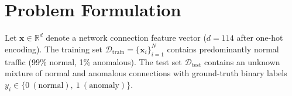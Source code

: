 \documentclass[12pt,a4paper]{article}
\begin{document}
\begin{table}[h!]
\centering
\caption{Comparison of Related Works and the Proposed Method}
\label{tab:related_gap}
\end{table}

\section{Problem Formulation}

Let $\mathbf{x} \in \mathbb{R}^{d}$ denote a network connection feature vector
($d = 114$ after one-hot encoding). The training set
$\mathcal{D}_{\text{train}} = \{\mathbf{x}_i\}_{i=1}^{N}$ contains predominantly
normal traffic (99\% normal, 1\% anomalous). The test set
$\mathcal{D}_{\text{test}}$ contains an unknown mixture of normal and
anomalous connections with ground-truth binary labels
$y_i \in \{0\ (\text{normal}),\ 1\ (\text{anomaly})\}$.
\end{document}
